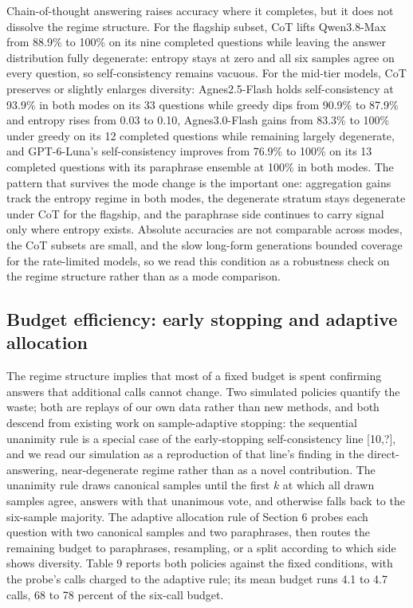 \documentclass[preprint,12pt]{elsarticle}
\begin{document}
Chain-of-thought answering raises accuracy where it completes, but it does not dissolve the regime structure. For the flagship subset, CoT lifts Qwen3.8-Max from 88.9\% to 100\% on its nine completed questions while leaving the answer distribution fully degenerate: entropy stays at zero and all six samples agree on every question, so self-consistency remains vacuous. For the mid-tier models, CoT preserves or slightly enlarges diversity: Agnes2.5-Flash holds self-consistency at 93.9\% in both modes on its 33 questions while greedy dips from 90.9\% to 87.9\% and entropy rises from 0.03 to 0.10, Agnes3.0-Flash gains from 83.3\% to 100\% under greedy on its 12 completed questions while remaining largely degenerate, and GPT-6-Luna's self-consistency improves from 76.9\% to 100\% on its 13 completed questions with its paraphrase ensemble at 100\% in both modes. The pattern that survives the mode change is the important one: aggregation gains track the entropy regime in both modes, the degenerate stratum stays degenerate under CoT for the flagship, and the paraphrase side continues to carry signal only where entropy exists. Absolute accuracies are not comparable across modes, the CoT subsets are small, and the slow long-form generations bounded coverage for the rate-limited models, so we read this condition as a robustness check on the regime structure rather than as a mode comparison.

\subsection{Budget efficiency: early stopping and adaptive allocation}


The regime structure implies that most of a fixed budget is spent confirming answers that additional calls cannot change. Two simulated policies quantify the waste; both are replays of our own data rather than new methods, and both descend from existing work on sample-adaptive stopping: the sequential unanimity rule is a special case of the early-stopping self-consistency line [10,?], and we read our simulation as a reproduction of that line's finding in the direct-answering, near-degenerate regime rather than as a novel contribution. The unanimity rule draws canonical samples until the first $k$ at which all drawn samples agree, answers with that unanimous vote, and otherwise falls back to the six-sample majority. The adaptive allocation rule of Section 6 probes each question with two canonical samples and two paraphrases, then routes the remaining budget to paraphrases, resampling, or a split according to which side shows diversity. Table 9 reports both policies against the fixed conditions, with the probe's calls charged to the adaptive rule; its mean budget runs 4.1 to 4.7 calls, 68 to 78 percent of the six-call budget.
\end{document}
